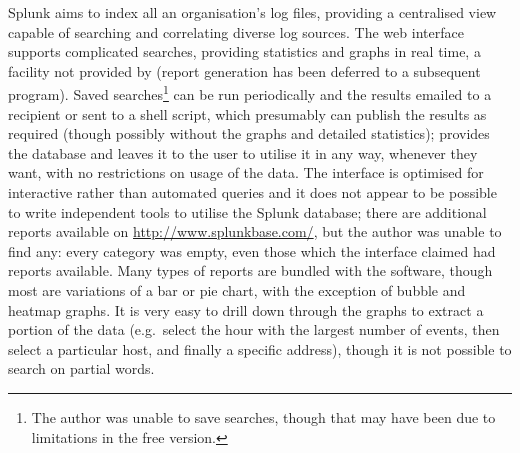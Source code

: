 Splunk aims to index all an organisation's log files, providing a
centralised view capable of searching and correlating diverse log sources.
The web interface supports complicated searches, providing statistics and
graphs in real time, a facility not provided by \parsername{} (report
generation has been deferred to a subsequent program).  Saved
searches\footnote{The author was unable to save searches, though that may
have been due to limitations in the free version.} can be run periodically
and the results emailed to a recipient or sent to a shell script, which
presumably can publish the results as required (though possibly without the
graphs and detailed statistics); \parsername{} provides the database and
leaves it to the user to utilise it in any way, whenever they want, with no
restrictions on usage of the data.  The interface is optimised for
interactive rather than automated queries and it does not appear to be
possible to write independent tools to utilise the Splunk database; there
are additional reports available on \url{http://www.splunkbase.com/}, but
the author was unable to find any: every category was empty, even those
which the interface claimed had reports available.  Many types of reports
are bundled with the software, though most are variations of a bar or pie
chart, with the exception of bubble and heatmap graphs.  It is very easy to
drill down through the graphs to extract a portion of the data (e.g.\
select the hour with the largest number of events, then select a particular
host, and finally a specific address), though it is not possible to search
on partial words.

